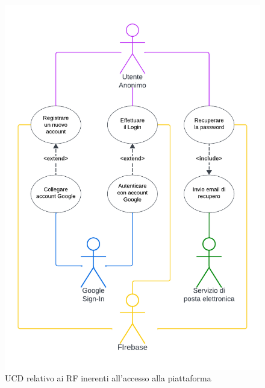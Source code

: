 \documentclass[11pt, a4paper]{article}
\theoremstyle{definition} %
\begin{document}
\begin{figure}[H]
\centering
\includegraphics[scale=0.67]{materiale/ucdiagrams/ucaccesso.pdf}
\caption{UCD relativo ai RF inerenti all'accesso alla piattaforma}
\label{access}
\end{figure}
\end{document}
